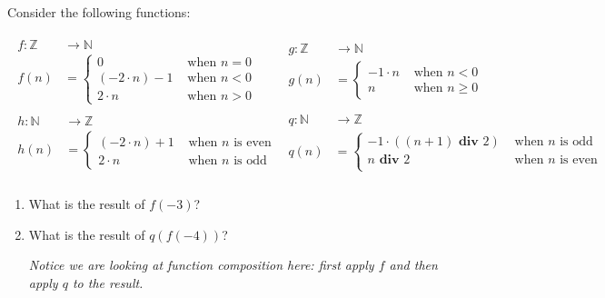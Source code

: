 \documentclass[12pt, oneside]{article}
\begin{document}
\begin{enumerate}
Consider the following functions:

\[
\begin{array}{l|l}
\begin{array}{ll}
f : \mathbb{Z} &\to \mathbb{N} \\
f(n) & = \begin{cases}
  0 & \textrm{ when } n = 0 \\
  (-2 \cdot n) - 1 & \textrm{ when } n < 0 \\
  2 \cdot n & \textrm{ when } n > 0
\end{cases}
\end{array}
&
\begin{array}{ll}
g : \mathbb{Z} &\to \mathbb{N} \\
g(n) & = \begin{cases}
  -1 \cdot n & \textrm{ when } n < 0 \\
  n & \textrm{ when } n \geq 0
\end{cases}
\end{array} \\
\hline

\begin{array}{ll}
h : \mathbb{N} &\to \mathbb{Z} \\
h(n) & = \begin{cases}
  (-2 \cdot n) + 1 & \textrm{ when } n \textrm{ is even } \\
  2 \cdot n & \textrm{ when } n \textrm{ is odd }
\end{cases}
\end{array}
&
\begin{array}{ll}
q : \mathbb{N} &\to \mathbb{Z} \\
q(n) & = \begin{cases}
  -1 \cdot ((n + 1) \textbf{ div } 2) & \textrm{ when } n \textrm{ is odd} \\
  n \textbf{ div } 2 & \textrm{ when } n \textrm{ is even} \\
\end{cases}
\end{array} \\
\end{array}
\]

\begin{enumerate}
\item What is the result of $f(-3)$?

\item What is the result of $q(f(-4))$?

 {\it Notice we are looking at function composition here: first apply $f$ and then apply 
 $q$ to the result.}


\end{enumerate}
\end{enumerate}
\end{document}
